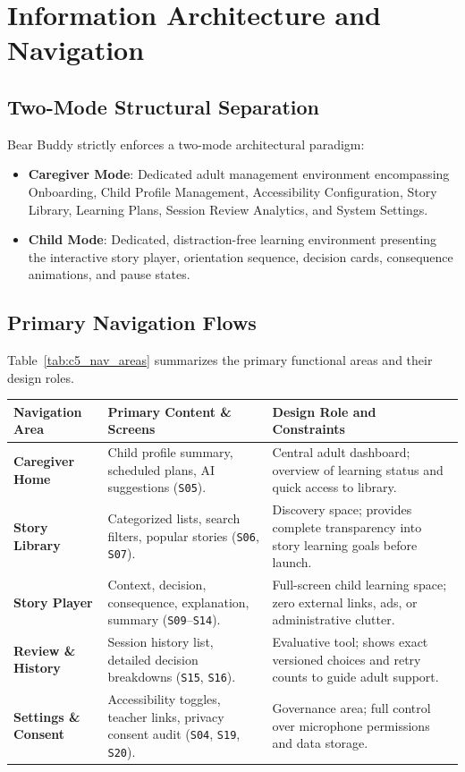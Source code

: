 \section{Information Architecture and Navigation}

\subsection{Two-Mode Structural Separation}

Bear Buddy strictly enforces a two-mode architectural paradigm:
\begin{itemize}
    \item \textbf{Caregiver Mode}: Dedicated adult management environment encompassing Onboarding, Child Profile Management, Accessibility Configuration, Story Library, Learning Plans, Session Review Analytics, and System Settings.
    \item \textbf{Child Mode}: Dedicated, distraction-free learning environment presenting the interactive story player, orientation sequence, decision cards, consequence animations, and pause states.
\end{itemize}

\subsection{Primary Navigation Flows}

Table~\ref{tab:c5_nav_areas} summarizes the primary functional areas and their design roles.

\begin{xltabular}{\textwidth}{|p{3.2cm}|p{4.5cm}|X|}
\hline
\textbf{Navigation Area} & \textbf{Primary Content \& Screens} & \textbf{Design Role and Constraints} \\ \hline
\endhead
\textbf{Caregiver Home} & Child profile summary, scheduled plans, AI suggestions (\texttt{S05}). & Central adult dashboard; overview of learning status and quick access to library. \\ \hline
\textbf{Story Library} & Categorized lists, search filters, popular stories (\texttt{S06}, \texttt{S07}). & Discovery space; provides complete transparency into story learning goals before launch. \\ \hline
\textbf{Story Player} & Context, decision, consequence, explanation, summary (\texttt{S09}--\texttt{S14}). & Full-screen child learning space; zero external links, ads, or administrative clutter. \\ \hline
\textbf{Review \& History} & Session history list, detailed decision breakdowns (\texttt{S15}, \texttt{S16}). & Evaluative tool; shows exact versioned choices and retry counts to guide adult support. \\ \hline
\textbf{Settings \& Consent} & Accessibility toggles, teacher links, privacy consent audit (\texttt{S04}, \texttt{S19}, \texttt{S20}). & Governance area; full control over microphone permissions and data storage. \\ \hline
\end{xltabular}
\label{tab:c5_nav_areas}

